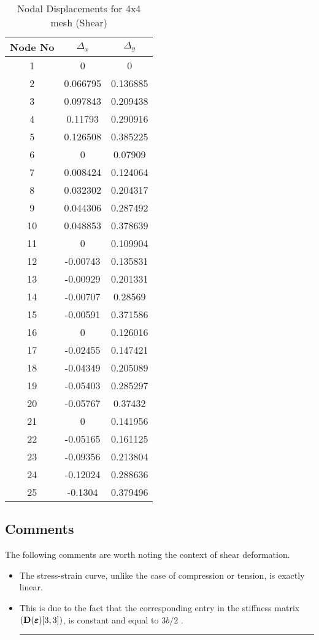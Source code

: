 \begin{table}[h!]
  \centering
  \caption{Nodal Displacements for 4x4 mesh (Shear)}
    \begin{tabular}{ccc}
    \toprule
    Node No & $\Delta_x$    & $\Delta_y$ \\
    \midrule
    1     & 0     & 0 \\
    2     & 0.066795 & 0.136885 \\
    3     & 0.097843 & 0.209438 \\
    4     & 0.11793 & 0.290916 \\
    5     & 0.126508 & 0.385225 \\
    6     & 0     & 0.07909 \\
    7     & 0.008424 & 0.124064 \\
    8     & 0.032302 & 0.204317 \\
    9     & 0.044306 & 0.287492 \\
    10    & 0.048853 & 0.378639 \\
    11    & 0     & 0.109904 \\
    12    & -0.00743 & 0.135831 \\
    13    & -0.00929 & 0.201331 \\
    14    & -0.00707 & 0.28569 \\
    15    & -0.00591 & 0.371586 \\
    16    & 0     & 0.126016 \\
    17    & -0.02455 & 0.147421 \\
    18    & -0.04349 & 0.205089 \\
    19    & -0.05403 & 0.285297 \\
    20    & -0.05767 & 0.37432 \\
    21    & 0     & 0.141956 \\
    22    & -0.05165 & 0.161125 \\
    23    & -0.09356 & 0.213804 \\
    24    & -0.12024 & 0.288636 \\
    25    & -0.1304 & 0.379496 \\
    \bottomrule
    \end{tabular}%
  \label{Displacements4b}%
\end{table}%
\subsection*{Comments}
The following comments are worth noting the context of shear deformation. 
\begin{itemize}
\item The stress-strain curve, unlike the case of compression or tension, is exactly linear. 
\item This is due to the fact that the corresponding entry in the stiffness matrix $({\bf D(\bm\varepsilon)}[3,3])$, is constant and equal to $3b/2$ . \\ \hrule 
\end{itemize}
